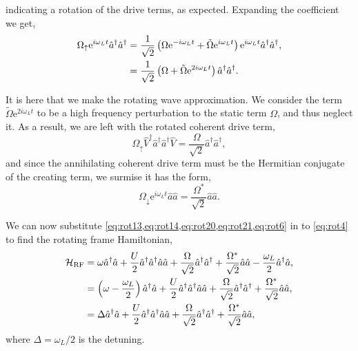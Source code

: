 indicating a rotation of the drive terms, as expected. Expanding the coefficient we get,
\begin{align}
	\Omega_{\uparrow}\mathrm{e}^{i\omega_{L}t}\hat{a}^{\dagger}\hat{a}^{\dagger} &= \frac{1}{\sqrt{2}}\left(\Omega\mathrm{e}^{-i\omega_{L}t} + \tilde{\Omega}\mathrm{e}^{i\omega_{L}t}\right)\mathrm{e}^{i\omega_{L}t}\hat{a}^{\dagger}\hat{a}^{\dagger}, \notag \\
	&= \frac{1}{\sqrt{2}}\left(\Omega + \tilde{\Omega}\mathrm{e}^{2i\omega_{L}t}\right)\hat{a}^{\dagger}\hat{a}^{\dagger}.
	\label{eq:rot19}
\end{align}

It is here that we make the rotating wave approximation. We consider the term \(\tilde{\Omega}\mathrm{e}^{2i\omega_{L}t}\) to be a high frequency perturbation to the static term \(\Omega\), and thus neglect it. As a result, we are left with the rotated coherent drive term,
\begin{equation}
	\Omega_{\uparrow}\hat{V}^{\dagger}\hat{a}^{\dagger}\hat{a}^{\dagger}\hat{V} = \frac{\Omega}{\sqrt{2}}\hat{a}^{\dagger}\hat{a}^{\dagger},
	\label{eq:rot20}
\end{equation}
and since the annihilating coherent drive term must be the Hermitian conjugate of the creating term, we surmise it has the form,
\begin{equation}
	\Omega_{\downarrow}\mathrm{e}^{i\omega_{L}t}\hat{a}\hat{a} = \frac{\Omega^{*}}{\sqrt{2}}\hat{a}\hat{a}.
	\label{eq:rot21}
\end{equation}

We can now substitute \cref{eq:rot13,eq:rot14,eq:rot20,eq:rot21,eq:rot6} in to \cref{eq:rot4} to find the rotating frame Hamiltonian,
\begin{align}
	\mathcal{H}_{\mathrm{RF}} &= \omega\hat{a}^{\dagger}\hat{a} + \frac{U}{2}\hat{a}^{\dagger}\hat{a}^{\dagger}\hat{a}\hat{a} + \frac{\Omega}{\sqrt{2}}\hat{a}^{\dagger}\hat{a}^{\dagger} + \frac{\Omega^{*}}{\sqrt{2}}\hat{a}\hat{a} - \frac{\omega_{L}}{2}\hat{a}^{\dagger}\hat{a}, \notag \\
	&= \left(\omega - \frac{\omega_{L}}{2}\right)\hat{a}^{\dagger}\hat{a} + \frac{U}{2}\hat{a}^{\dagger}\hat{a}^{\dagger}\hat{a}\hat{a} + \frac{\Omega}{\sqrt{2}}\hat{a}^{\dagger}\hat{a}^{\dagger} + \frac{\Omega^{*}}{\sqrt{2}}\hat{a}\hat{a}, \notag \\
	&= \Delta\hat{a}^{\dagger}\hat{a} + \frac{U}{2}\hat{a}^{\dagger}\hat{a}^{\dagger}\hat{a}\hat{a} + \frac{\Omega}{\sqrt{2}}\hat{a}^{\dagger}\hat{a}^{\dagger} + \frac{\Omega^{*}}{\sqrt{2}}\hat{a}\hat{a},
	\label{eq:rot22}
\end{align}
where \(\Delta = \omega_{L}/2\) is the detuning.

